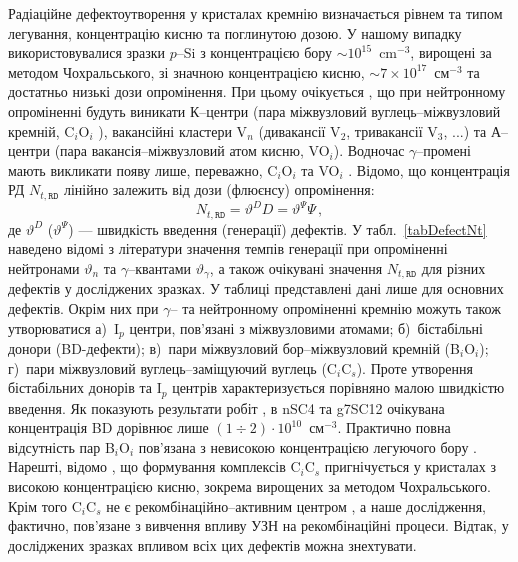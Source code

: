Радіаційне  дефектоутворення у кристалах кремнію
визначається рівнем та типом легування, концентрацію кисню та поглинутою дозою.
У нашому випадку використовувалися зразки $p$--Si з концентрацією бору $\sim10^{15}$~cm$^{-3}$,
вирощені за методом Чохральського, зі значною концентрацією
кисню, $\sim7\times10^{17}$~см$^{-3}$ та достатньо низькі дози опромінення.
При цьому очікується \cite{n:long,n:gamma,Moll:PhD}, що при нейтронному опроміненні будуть виникати
К--центри (пара міжвузловий вуглець--міжвузловий кремній, C$_i$O$_i$ ),
вакансійні кластери V$_n$ (дивакансії V$_2$, тривакансії V$_3$, ...) та
А--центри (пара вакансія--міжвузловий атом кисню, VO$_i$).
Водночас $\gamma$--промені мають викликати появу лише, переважно, C$_i$O$_i$ та VO$_i$ \cite{gamma:Stahl,Moll:PhD,gamma:Kolkr,A:Caracas}.
Відомо, що концентрація РД $N_{t,\mathtt{RD}}$ лінійно залежить від дози (флюєнсу) опромінення:
\begin{equation}
\label{eqNtRD}
    N_{t,\mathtt{RD}}=\vartheta^{D} D=\vartheta^{\Psi}\Psi \,,
\end{equation}
де $\vartheta^{D}$ ($\vartheta^{\Psi}$) --- швидкість введення (генерації) дефектів.
У табл.~\ref{tabDefectNt} наведено відомі з літератури
значення темпів генерації при опроміненні нейтронами $\vartheta_n$ та $\gamma$--квантами $\vartheta_\gamma$, а також
очікувані значення $N_{t,\mathtt{RD}}$ для різних дефектів у досліджених зразках.
У таблиці представлені дані лише для основних дефектів.
Окрім них при $\gamma$-- та нейтронному опроміненні кремнію можуть також утворюватися
а)~I$_p$ центри, пов'язані з міжвузловими атомами;
б)~бістабільні донори (BD-дефекти);
в)~пари міжвузловий бор--міжвузловий кремній (B$_i$O$_i$);
г)~пари міжвузловий вуглець--заміщуючий вуглець (C$_i$C$_s$).
Проте утворення бістабільних донорів та I$_p$ центрів характеризується порівняно малою швидкістю введення.
Як показують результати робіт \cite{n:gamma,BD:Fret}, в nSC4 та g7SC12 очікувана
концентрація BD дорівнює лише $(1\div2)\cdot10^{10}$~см$^{-3}$.
Практично повна відсутність пар B$_i$O$_i$ пов'язана з невисокою концентрацією легуючого бору \cite{SiIntDef}.
Нарешті, відомо \cite{gamma:Kolkr,gamma:Stahl,n:long}, що формування комплексів C$_i$C$_s$ пригнічується у кристалах
з високою концентрацією кисню, зокрема вирощених за методом Чохральського.
Крім того  C$_i$C$_s$ не є рекомбінаційно--активним центром \cite{CiCs:Song}, а наше дослідження,
фактично, пов'язане з вивчення впливу УЗН на рекомбінаційні процеси.
Відтак, у досліджених зразках впливом всіх цих дефектів можна знехтувати.


